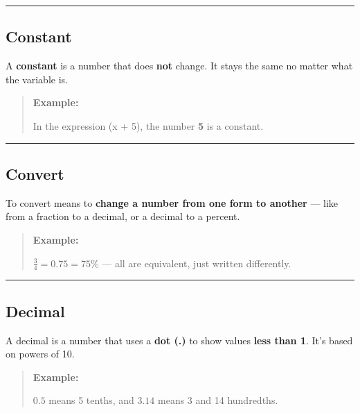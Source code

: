 \documentclass[
  letterpaper,
  DIV=11,
  numbers=noendperiod]{scrreprt}
\begin{document}
\begin{center}\rule{0.5\linewidth}{0.5pt}\end{center}

\subsection*{Constant}\label{glossary-constant}

A \textbf{constant} is a number that does \textbf{not} change. It stays
the same no matter what the variable is.

\begin{quote}
\textbf{Example:}

In the expression (x + 5), the number \textbf{5} is a constant.
\end{quote}

\begin{center}\rule{0.5\linewidth}{0.5pt}\end{center}

\subsection*{Convert}\label{glossary-convert}

To convert means to \textbf{change a number from one form to another}
--- like from a fraction to a decimal, or a decimal to a percent.

\begin{quote}
\textbf{Example:}

\(\frac{3}{4} = 0.75 = 75\%\) --- all are equivalent, just written
differently.
\end{quote}

\begin{center}\rule{0.5\linewidth}{0.5pt}\end{center}

\subsection*{Decimal}\label{glossary-decimal}

A decimal is a number that uses a \textbf{dot (.)} to show values
\textbf{less than 1}. It's based on powers of 10.

\begin{quote}
\textbf{Example:}

\(0.5\) means 5 tenths, and \(3.14\) means 3 and 14 hundredths.
\end{quote}
\end{document}
